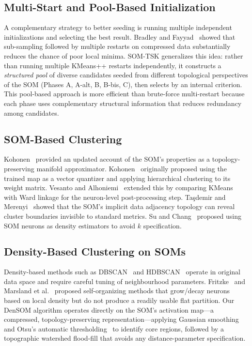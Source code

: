 \documentclass[journal]{IEEEtran}
\begin{document}
\subsection{Multi-Start and Pool-Based Initialization}

A complementary strategy to better seeding is running multiple independent initializations and selecting the best result. Bradley and Fayyad~\cite{bradley1998refining} showed that sub-sampling followed by multiple restarts on compressed data substantially reduces the chance of poor local minima. SOM-TSK generalizes this idea: rather than running multiple KMeans++ restarts independently, it constructs a \emph{structured pool} of diverse candidates seeded from different topological perspectives of the SOM (Phases A, A-alt, B, B-bis, C), then selects by an internal criterion. This pool-based approach is more efficient than brute-force multi-restart because each phase uses complementary structural information that reduces redundancy among candidates.

\subsection{SOM-Based Clustering}

Kohonen~\cite{kohonen2013essentials} provided an updated account of the SOM's properties as a topology-preserving manifold approximator. Kohonen~\cite{kohonen2001self} originally proposed using the trained map as a vector quantizer and applying hierarchical clustering to its weight matrix. Vesanto and Alhoniemi~\cite{vesanto2000clustering} extended this by comparing KMeans with Ward linkage for the neuron-level post-processing step. Taşdemir and Merenyi~\cite{tasdemir2009exploiting} showed that the SOM's implicit data adjacency topology can reveal cluster boundaries invisible to standard metrics. Su and Chang~\cite{su2010self} proposed using SOM neurons as density estimators to avoid $k$ specification.

\subsection{Density-Based Clustering on SOMs}

Density-based methods such as DBSCAN~\cite{ester1996density} and HDBSCAN~\cite{campello2013density} operate in original data space and require careful tuning of neighbourhood parameters. Fritzke~\cite{fritzke1994growing} and Marsland et al.~\cite{marsland2002self} proposed self-organizing methods that grow/decay neurons based on local density but do not produce a readily usable flat partition. Our DenSOM algorithm operates directly on the SOM's activation map—a compressed, topology-preserving representation—applying Gaussian smoothing and Otsu's automatic thresholding~\cite{otsu1979threshold} to identify core regions, followed by a topographic watershed flood-fill that avoids any distance-parameter specification.
\end{document}
